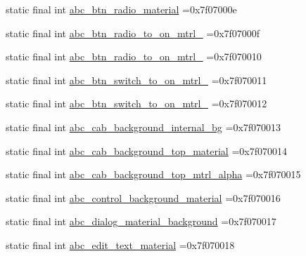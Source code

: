\begin{DoxyCompactItemize}
\item 
static final int \mbox{\hyperlink{classbr_1_1unb_1_1cic_1_1mp_1_1marketmaster_1_1test_1_1R_1_1drawable_a4fc5a1263a94f5c94a016b04996d97e1}{abc\+\_\+btn\+\_\+radio\+\_\+material}} =0x7f07000e
\item 
static final int \mbox{\hyperlink{classbr_1_1unb_1_1cic_1_1mp_1_1marketmaster_1_1test_1_1R_1_1drawable_a2804c2da69dda1cc19654e11ee3abb2c}{abc\+\_\+btn\+\_\+radio\+\_\+to\+\_\+on\+\_\+mtrl\+\_}} =0x7f07000f
\item 
static final int \mbox{\hyperlink{classbr_1_1unb_1_1cic_1_1mp_1_1marketmaster_1_1test_1_1R_1_1drawable_a57ded11a10c2b89df2f8a788d129e514}{abc\+\_\+btn\+\_\+radio\+\_\+to\+\_\+on\+\_\+mtrl\+\_}} =0x7f070010
\item 
static final int \mbox{\hyperlink{classbr_1_1unb_1_1cic_1_1mp_1_1marketmaster_1_1test_1_1R_1_1drawable_a84efc07e5669cb3b3f2d14c76c1b2700}{abc\+\_\+btn\+\_\+switch\+\_\+to\+\_\+on\+\_\+mtrl\+\_}} =0x7f070011
\item 
static final int \mbox{\hyperlink{classbr_1_1unb_1_1cic_1_1mp_1_1marketmaster_1_1test_1_1R_1_1drawable_a540d425cfa5454390041c03cfa91a695}{abc\+\_\+btn\+\_\+switch\+\_\+to\+\_\+on\+\_\+mtrl\+\_}} =0x7f070012
\item 
static final int \mbox{\hyperlink{classbr_1_1unb_1_1cic_1_1mp_1_1marketmaster_1_1test_1_1R_1_1drawable_afe0cccfad5667d40443478364d7d291e}{abc\+\_\+cab\+\_\+background\+\_\+internal\+\_\+bg}} =0x7f070013
\item 
static final int \mbox{\hyperlink{classbr_1_1unb_1_1cic_1_1mp_1_1marketmaster_1_1test_1_1R_1_1drawable_a693761c6312491d7f24638439004b721}{abc\+\_\+cab\+\_\+background\+\_\+top\+\_\+material}} =0x7f070014
\item 
static final int \mbox{\hyperlink{classbr_1_1unb_1_1cic_1_1mp_1_1marketmaster_1_1test_1_1R_1_1drawable_a422dd1d52f7530b0753ce6b389635ab6}{abc\+\_\+cab\+\_\+background\+\_\+top\+\_\+mtrl\+\_\+alpha}} =0x7f070015
\item 
static final int \mbox{\hyperlink{classbr_1_1unb_1_1cic_1_1mp_1_1marketmaster_1_1test_1_1R_1_1drawable_aa724bb9133cfe6276b21ebf23d217417}{abc\+\_\+control\+\_\+background\+\_\+material}} =0x7f070016
\item 
static final int \mbox{\hyperlink{classbr_1_1unb_1_1cic_1_1mp_1_1marketmaster_1_1test_1_1R_1_1drawable_a0b8a1f55f52ade278f7c2f900508725b}{abc\+\_\+dialog\+\_\+material\+\_\+background}} =0x7f070017
\item 
static final int \mbox{\hyperlink{classbr_1_1unb_1_1cic_1_1mp_1_1marketmaster_1_1test_1_1R_1_1drawable_a2a54e14ffab1effc914deca4ca435ee6}{abc\+\_\+edit\+\_\+text\+\_\+material}} =0x7f070018

\end{DoxyCompactItemize}
